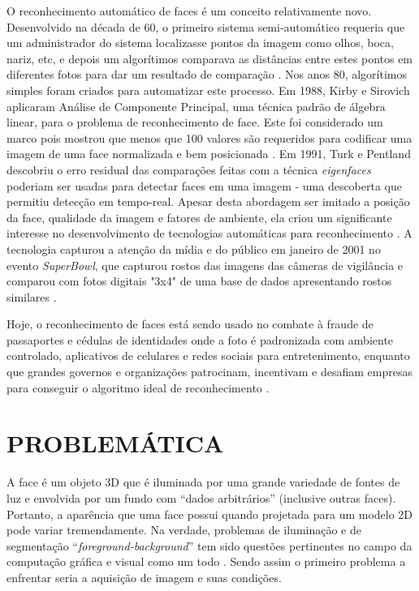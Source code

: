 O reconhecimento automático de faces é um conceito relativamente novo. Desenvolvido na década de 60, o primeiro sistema semi-automático requeria que um administrador do sistema localizasse pontos da imagem como olhos, boca, nariz,  etc, e depois um algorítimos comparava as distâncias entre estes pontos em diferentes fotos para dar um resultado de comparação \cite{nstc_homeland}. Nos anos 80, algorítimos simples foram criados para automatizar este processo. Em 1988, Kirby e Sirovich aplicaram Análise de Componente Principal, uma técnica padrão de álgebra linear, para o problema de reconhecimento de face. Este foi considerado um marco pois mostrou que menos que 100 valores são requeridos para codificar uma imagem de uma face normalizada e bem posicionada \cite{nstc_homeland}. Em 1991, Turk e Pentland descobriu o erro residual das comparações feitas com a técnica \textit{eigenfaces} poderiam ser usadas para detectar faces em uma imagem - uma descoberta que permitiu detecção em tempo-real. Apesar desta abordagem ser imitado a posição da face, qualidade da imagem e fatores de ambiente, ela criou um significante interesse no desenvolvimento de tecnologias automáticas para reconhecimento \cite{nstc_homeland}. A tecnologia capturou a atenção da mídia e do público em janeiro de 2001 no evento \textit{SuperBowl}, que capturou rostos das imagens das câmeras de vigilância e comparou com fotos digitais "3x4" de uma base de dados apresentando rostos similares \cite{nstc_homeland}.

Hoje, o reconhecimento de faces está sendo usado no combate à fraude de passaportes e cédulas de identidades onde a foto é padronizada com ambiente controlado, aplicativos de celulares e redes sociais para entretenimento, enquanto que grandes governos e organizações patrocinam, incentivam e desafiam empresas para conseguir o algoritmo ideal de reconhecimento \cite{nyu_ccpr_frt}.



\section{PROBLEMÁTICA}\label{sec:problematica}

A face é um objeto 3D que é iluminada por uma grande variedade de fontes de luz e envolvida por um fundo com “dados arbitrários” (inclusive outras faces). Portanto, a aparência que uma face possui quando projetada para um modelo 2D pode variar tremendamente. Na verdade, problemas de iluminação e de segmentação “\textit{foreground-background}” tem sido questões pertinentes no campo da computação gráfica e visual como um todo \cite{tony_columbia}. Sendo assim o primeiro problema a enfrentar seria a aquisição de imagem e suas condições.


